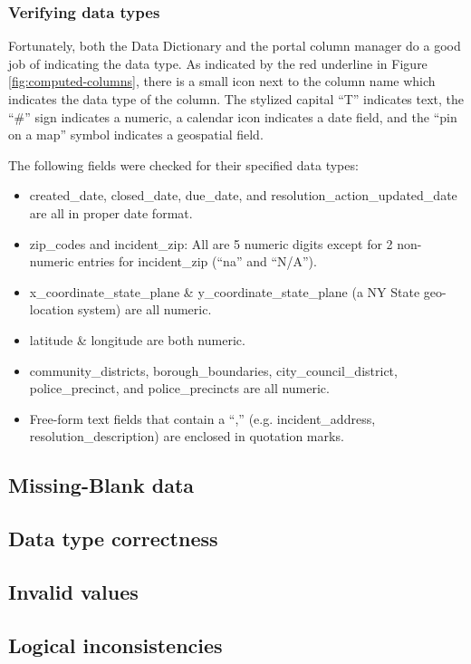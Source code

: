 \documentclass[12pt, titlepage]{article}
\begin{document}
	\subsubsection{Verifying data types}
	Fortunately, both the Data Dictionary and the portal column manager do a good job of indicating the data type.
	As indicated by the red underline in Figure \ref{fig:computed-columns}, there is a small icon next to the column name 
	which indicates the data type of the column. The stylized capital ``T'' indicates text, the ``\#'' sign indicates 
	a numeric, a calendar icon indicates a date field, and the ``pin on a map'' symbol indicates a geospatial field. 
	
	The following fields were checked for their specified data types:
		\begin{itemize}
		\item created\_date, closed\_date, due\_date, and resolution\_action\_updated\_date are all in proper date format.
		\item zip\_codes and incident\_zip: All are 5 numeric digits except for 2 non-numeric entries for incident\_zip (``na'' and ``N/A'').
		\item x\_coordinate\_state\_plane \&  y\_coordinate\_state\_plane (a NY State geo-location system) are all numeric.
		\item latitude \& longitude are both numeric.
		\item community\_districts, borough\_boundaries, city\_council\_district, police\_precinct, and police\_precincts are all numeric.
		\item Free-form text fields that contain a ``,'' (e.g. incident\_address, resolution\_description) are enclosed in quotation marks.
		\end{itemize}	
	


\subsection{Missing-Blank data}


\subsection{Data type correctness}

\subsection{Invalid values}

\subsection{Logical inconsistencies }
\end{document}
